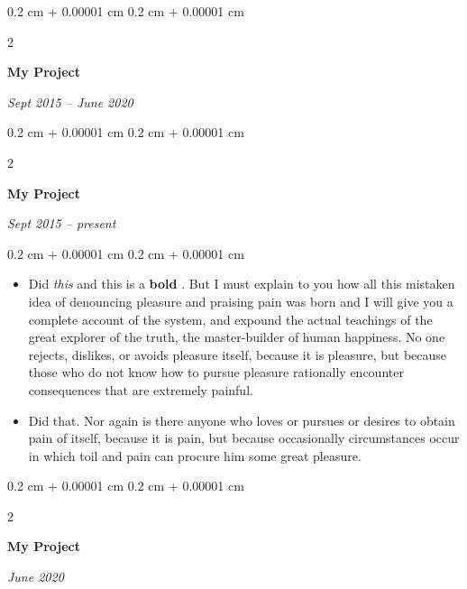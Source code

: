 \documentclass[10pt, letterpaper]{article}
\newenvironment{highlights}{
    \begin{itemize}[
        topsep=0.10 cm,
        parsep=0.10 cm,
        partopsep=0pt,
        itemsep=0pt,
        leftmargin=0.4 cm + 10pt
    ]
}{
    \end{itemize}
} %
\newenvironment{onecolentry}{
    \begin{adjustwidth}{
        0.2 cm + 0.00001 cm
    }{
        0.2 cm + 0.00001 cm
    }
}{
    \end{adjustwidth}
} %
\newenvironment{twocolentry}[2][]{
    \onecolentry
    \def\secondColumn{#2}
    \setcolumnwidth{\fill, 4.5 cm}
    \begin{paracol}{2}
}{
    \switchcolumn \raggedleft \secondColumn
    \end{paracol}
    \endonecolentry
} %
\let\hrefWithoutArrow\href
\renewcommand{\href}[2]{\hrefWithoutArrow{#1}{\ifthenelse{\equal{#2}{}}{ }{#2 }\raisebox{.15ex}{\footnotesize \faExternalLink*}}}
\begin{document}
        \vspace{0.2 cm}

        \begin{twocolentry}{
            
            
        \textit{Sept 2015 – June 2020}}
            \textbf{My Project}
        \end{twocolentry}



        \vspace{0.2 cm}

        \begin{twocolentry}{
            
            
        \textit{Sept 2015 – present}}
            \textbf{My Project}
        \end{twocolentry}

        \vspace{0.10 cm}
        \begin{onecolentry}
            \begin{highlights}
                \item Did \textit{this} and this is a \textbf{bold} \href{https://example.com}{link}. But I must explain to you how all this mistaken idea of denouncing pleasure and praising pain was born and I will give you a complete account of the system, and expound the actual teachings of the great explorer of the truth, the master-builder of human happiness. No one rejects, dislikes, or avoids pleasure itself, because it is pleasure, but because those who do not know how to pursue pleasure rationally encounter consequences that are extremely painful.
                \item Did that. Nor again is there anyone who loves or pursues or desires to obtain pain of itself, because it is pain, but because occasionally circumstances occur in which toil and pain can procure him some great pleasure.
            \end{highlights}
        \end{onecolentry}


        \vspace{0.2 cm}

        \begin{twocolentry}{
            
            
        \textit{June 2020}}
            \textbf{My Project}
        \end{twocolentry}
\end{document}
